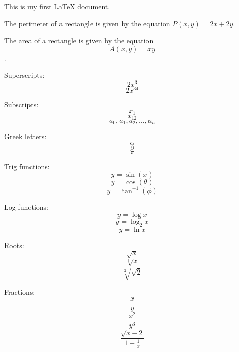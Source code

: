 \documentclass[12pt]{article}
\begin{document}
This is my first \LaTeX{} document.

The perimeter of a rectangle is given by the equation $P(x,y)=2x+2y$. %

The area of a rectangle is given by the equation $$A(x,y)=xy$$. %

Superscripts: 
$$2x^3$$
$$2x^{34}$$

Subscripts:
$$x_1$$
$$x_{12}$$
$$a_0, a_1, a_2, \ldots, a_n$$

Greek letters:
$$\alpha$$
$$\beta$$
$$\pi$$

Trig functions:
$$y=\sin(x)$$
$$y=\cos(\theta)$$
$$y=\tan^{-1}(\phi)$$

Log functions:
$$y=\log x$$
$$y=\log_2 x$$
$$y=\ln x$$

Roots:
$$\sqrt{x}$$
$$\sqrt[3]{x}$$
$$\sqrt[3]{\sqrt{2}}$$

Fractions:
$$\frac{x}{y}$$
$$\frac{x^2}{y^3}$$
$$\frac{\sqrt{x-2}}{1+\frac{1}{x}}$$
\end{document}

